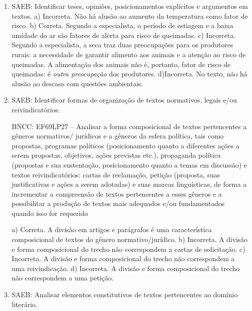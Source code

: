 
\begin{enumerate}
	
	\item
SAEB: Identificar teses, opiniões, posicionamentos explícitos e
argumentos em textos.  
a) Incorreta. Não há alusão ao aumento da temperatura como fator de risco.
b) Correta. Segundo a especialista, o período de estiagem e a baixa
umidade do ar são fatores de alerta para risco de queimadas.
c) Incorreta. Segundo a especialista, a seca traz duas preocupações para 
os produtores rurais: a necessidade de garantir alimento aos animais e a 
atenção ao risco de queimadas. A alimentação dos animais não é, portanto,
fator de risco de queimadas: é \textit{outra preocupação} dos produtores. 
d)Incorreta. No texto, não há alusão ao descaso com questões ambientais.

	\item
SAEB: Identificar formas de organização de textos normativos, legais e/ou reivindicatórios.

BNCC: EF69LP27 -- Analisar a forma composicional de textos pertencentes a
gêneros normativos/ jurídicos e a gêneros da esfera política, tais como
propostas, programas políticos (posicionamento quanto a diferentes ações
a serem propostas, objetivos, ações previstas etc.), propaganda política
(propostas e sua sustentação, posicionamento quanto a temas em
discussão) e textos reivindicatórios: cartas de reclamação, petição
(proposta, suas justificativas e ações a serem adotadas) e suas marcas
linguísticas, de forma a incrementar a compreensão de textos
pertencentes a esses gêneros e a possibilitar a produção de textos mais
adequados e/ou fundamentados quando isso for requerido

a) Correta. A divisão em artigos e parágrafos é uma característica
composicional de textos do gênero normativo/jurídico.
b) Incorreta. A divisão e forma composicional do trecho não correspondem
a cartas de solicitação.
c) Incorreta. A divisão e forma composicional do trecho não correspondem
a uma reivindicação.
d) Incorreta. A divisão e forma composicional do trecho não correspondem
a uma petição.	

	\item
SAEB: Analisar elementos constitutivos de textos pertencentes ao domínio
literário.


\end{enumerate}
